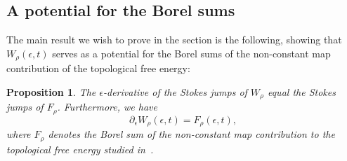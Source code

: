 \documentclass[pdftex]{sigma}
\numberwithin{equation}{section}
\newtheorem{Proposition}[Theorem]{Proposition}
 { \theoremstyle{definition}
\newtheorem{Definition}[Theorem]{Definition}
\newtheorem{Note}[Theorem]{Note}
\newtheorem{Example}[Theorem]{Example}
\newtheorem{Remark}[Theorem]{Remark} }
\begin{document}
\subsection{A potential for the Borel sums}

The main result we wish to prove in the section is the following, showing that $W_{\rho}(\epsilon,t)$ serves as a potential for the Borel sums of the non-constant map contribution of the topological free energy:

\begin{Proposition} The $\epsilon$-derivative of the Stokes jumps of $W_{\rho}$ equal the Stokes jumps of $F_{\rho}$. Furthermore, we have
\begin{equation}\label{pot}
 \partial_{\epsilon}W_{\rho}(\epsilon,t)=F_{\rho}(\epsilon,t),
\end{equation}
where $F_{\rho}$ denotes the Borel sum of the non-constant map contribution to the topological free energy studied in~{\rm \cite{ASTT21}}.
\end{Proposition}
\end{document}
